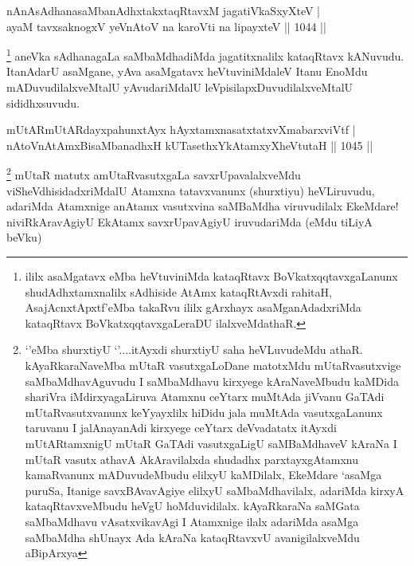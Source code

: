 \begin{shl}
nAnAsAdhanasaMbanAdhxtakxtaqRtavxM jagatiVkaSxyXteV | \\
ayaM tavxsaknogxV yeVnAtoV na karoVti na lipayxteV \hfill||  1044 ||   
\end{shl}

\begin{artha}
\footnote{ililx asaMgatavx eMba heVtuviniMda kataqRtavx BoVkatxqqtavxgaLanunx shudAdhxtamxnalilx sAdhiside AtAmx kataqRtAvxdi rahitaH, AsajAcnxtApxtf'eMba takaRvu ililx gArxhayx asaMganAdadxriMda kataqRtavx BoVkatxqqtavxgaLeraDU ilalxveMdathaR.}
aneVka sAdhanagaLa saMbaMdhadiMda jagatitxnalilx kataqRtavx kANuvudu. ItanAdarU asaMgane, yAva 
asaMgatavx heVtuviniMdaleV Itanu EnoMdu mADuvudilalxveMtalU yAvudariMdalU leVpisilapxDuvudilalxveMtalU sididhxsuvudu. 
\end{artha}


\begin{shl}
mUtARmUtARdayxpahunxtAyx hAyxtamxnasatxtatxvXmabarxviVtf | \\
nAtoV\s nAtAmxBisaMbanadhxH kUTasethxYkAtamxyXheVtutaH \hfill||  1045 ||  
\end{shl}

\begin{artha}
\footnote{`\stext'eMba shurxtiyU `\stext'....itAyxdi shurxtiyU saha heVLuvudeMdu athaR. kAyaRkaraNaveMba mUtaR vasutxgaLoDane matotxMdu mUtaRvasutxvige saMbaMdhavAguvudu I saMbaMdhavu kirxyege kAraNaveMbudu kaMDida shariVra iMdirxyagaLiruva Atamxnu ceYtarx muMtAda jiVvanu GaTAdi mUtaRvasutxvanunx keYyayxlilx hiDidu jala muMtAda vasutxgaLanunx taruvanu I jalAnayanAdi kirxyege ceYtarx deVvadatatx itAyxdi mUtARtamxnigU mUtaR GaTAdi vasutxgaLigU saMBaMdhaveV kAraNa I mUtaR vasutx athavA AkAravilalxda shudadhx parxtayxgAtamxnu kamaRvanunx mADuvudeMbudu elilxyU kaMDilalx, EkeMdare `asaMga puruSa, Itanige savxBAvavAgiye elilxyU saMbaMdhavilalx, adariMda kirxyA kataqRtavxveMbudu heVgU hoMduvidilalx. kAyaRkaraNa saMGata saMbaMdhavu vAsatxvikavAgi I Atamxnige ilalx adariMda asaMga saMbaMdha shUnayx Ada kAraNa kataqRtavxvU avanigilalxveMdu aBipArxya}
mUtaR matutx amUtaRvasutxgaLa savxrUpavalalxveMdu viSheVdhisidadxriMdalU Atamxna tatavxvanunx (shurxtiyu) heVLiruvudu, adariMda Atamxnige anAtamx vasutxvina saMBaMdha viruvudilalx EkeMdare! niviRkAravAgiyU EkAtamx savxrUpavAgiyU iruvudariMda (eMdu tiLiyA beVku)
\end{artha}

